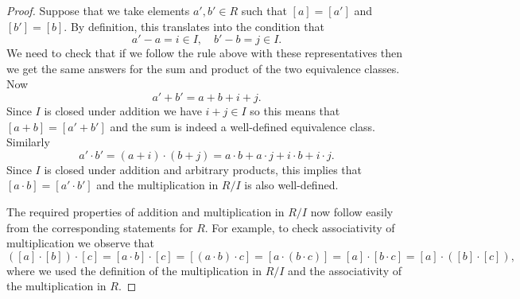 \documentclass [12pt,oneside,a4paper,mathscr]{amsart}
\theoremstyle{definition}
\begin{document}
\begin{proof}
 Suppose  that we take  elements  $a',b'\in R$ such that
$[a]=[a'] $ and  $[b']=[b]$.
 By definition, this translates into the condition that
\[a'-a=i\in I, \quad b'-b=j\in I.\]
We need to check that if we follow the rule above with these representatives then we get the same answers for the sum and product of the two equivalence classes. Now
\[a'+b'=a+b+i+j.\]
Since $I$ is closed under addition we have $i+j\in I$ so this  means that $[a+b]=[a'+b']$
 and the sum 
 is indeed a well-defined equivalence class. Similarly
\[a'\cdot b'=(a+i)\cdot (b+j)=a\cdot b+a \cdot j + i \cdot b + i\cdot j.\]
Since $I$ is closed under addition and arbitrary products, this implies that
$[a\cdot b]= [a'\cdot b']$ and  the multiplication in $R/I$ is also well-defined.

The required properties of addition and multiplication in $R/I$ now follow easily from the corresponding statements for $R$. For example, to check associativity of multiplication we observe that
\[([a]\cdot[b])\cdot [c]=[a\cdot b]\cdot [c]=[(a\cdot b)\cdot c]=[a\cdot(b\cdot c)]=[a]\cdot[b\cdot c]=[a]\cdot([b]\cdot [c]),\]
where we used  the definition of the multiplication in $R/I$ and the associativity of the multiplication in $R$.
 \end{proof}
\end{document}
